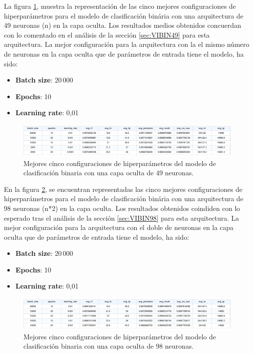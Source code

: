 La figura \ref{fig:BINhs49}, muestra la representación de las cinco mejores configuraciones de hiperparámetros para el modelo de clasificación binária con una arquitectura de 49 neuronas (n) en la capa oculta. Los resultados medios obtenidos concuerdan con lo comentado en el análisis de la sección \ref{sec:VIBIN49} para esta arquitectura. La mejor configuración para la arquitectura con la el mismo número de neuronas en la capa oculta que de parámetros de entrada tiene el modelo, ha sido:
\begin{itemize}
	\item \textbf{Batch size}: 20\,000
	\item \textbf{Epochs}: 10
	\item \textbf{Learning rate}: 0,01
\end{itemize}

\begin{figure}[H]
    \centering
    \includegraphics[width=1\textwidth]{./img/modelo/BINhs49.pdf}
    \caption{Mejores cinco configuraciones de hiperparámetros del modelo de clasificación binaria con una capa oculta de 49 neuronas.}
    \label{fig:BINhs49}
\end{figure}


En la figura \ref{fig:BINhs98}, se encuentran representadas las cinco mejores configuraciones de hiperparámetros para el modelo de clasificación binária con una arquitectura de 98 neuronas (n*2) en la capa oculta. Los resultados obtenidos coindiden con lo esperado tras el análisis de la sección \ref{sec:VIBIN98} para esta arquitectura. La mejor configuración para la arquitectura con el doble de neuronas en la capa oculta que de parámetros de entrada tiene el modelo, ha sido:
\begin{itemize}
	\item \textbf{Batch size}: 20\,000
	\item \textbf{Epochs}: 10
	\item \textbf{Learning rate}: 0,01
\end{itemize}

\begin{figure}[H]
    \centering
    \includegraphics[width=1\textwidth]{./img/modelo/BINhs98.pdf}
    \caption{Mejores cinco configuraciones de hiperparámetros del modelo de clasificación binaria con una capa oculta de 98 neuronas.}
    \label{fig:BINhs98}
\end{figure}

